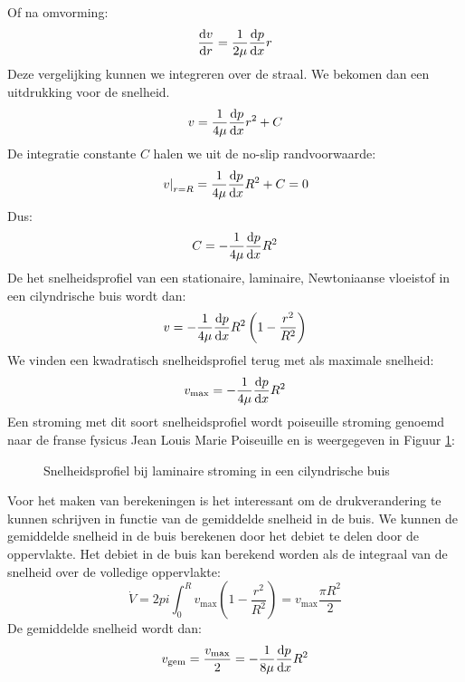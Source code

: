 Of na omvorming:
\begin{equation}
	\frac{\mathrm{d} v}{\mathrm{d} r} = \frac{1}{2 \mu}\frac{\mathrm{d} p}{\mathrm{d} x} r
\end{equation}
Deze vergelijking kunnen we integreren over de straal. We bekomen dan een uitdrukking voor de snelheid.
\begin{equation}
	v = \frac{1}{4 \mu}\frac{\mathrm{d} p}{\mathrm{d} x} r^2 + C
\end{equation}
De integratie constante $C$ halen we uit de no-slip randvoorwaarde:
\begin{equation}
	\left.v\right|_{r=R} = \frac{1}{4 \mu}\frac{\mathrm{d} p}{\mathrm{d} x} R^2 + C  = 0
\end{equation}
Dus:
\begin{equation}
	C = - \frac{1}{4 \mu}\frac{\mathrm{d} p}{\mathrm{d} x} R^2
\end{equation}
De het snelheidsprofiel van een stationaire, laminaire, Newtoniaanse vloeistof in een cilyndrische buis wordt dan:
\begin{equation}
	v = - \frac{1}{4 \mu}\frac{\mathrm{d} p}{\mathrm{d} x} R^2 \left(1- \frac{r^2}{R^2}\right)
\end{equation}
We vinden een kwadratisch snelheidsprofiel terug met als maximale snelheid:
\begin{equation}
	v_{\text{max}} = - \frac{1}{4 \mu}\frac{\mathrm{d} p}{\mathrm{d} x} R^2
\end{equation}
Een stroming met dit soort snelheidsprofiel wordt poiseuille stroming genoemd naar de franse fysicus Jean Louis Marie Poiseuille en is weergegeven in Figuur \ref{fig:laminair_snelheidsprofiel}:
\begin{figure}
	\centering
	
	\caption{Snelheidsprofiel bij laminaire stroming in een cilyndrische buis}
	\label{fig:laminair_snelheidsprofiel}
\end{figure}
\npar
Voor het maken van berekeningen is het interessant om de drukverandering te kunnen schrijven in functie van de gemiddelde snelheid in de buis. We kunnen de gemiddelde snelheid in de buis berekenen door het debiet te delen door de oppervlakte. Het debiet in de buis kan berekend worden als de integraal van de snelheid over de volledige oppervlakte:
\begin{equation}
	\dot{V} = 2 pi \int_0^R v_{\text{max}} \left(1- \frac{r^2}{R^2}\right) = v_{\text{max}} \frac{\pi R^2}{2}
\end{equation}
De gemiddelde snelheid wordt dan:
\begin{equation}
	v_{\text{gem}} = \frac{v_{\text{max}}}{2} = - \frac{1}{8 \mu}\frac{\mathrm{d} p}{\mathrm{d} x} R^2
\end{equation}
